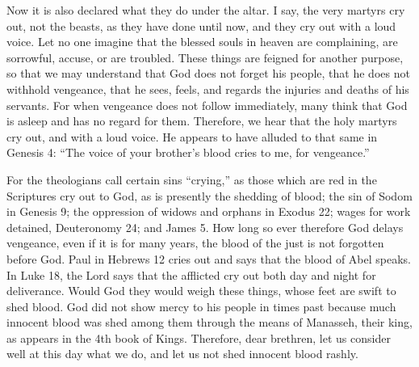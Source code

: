 Now it is also declared what they do under the altar. I say, the very martyrs cry out, not the beasts, as they have done until now, and they cry out with a loud voice. Let no one imagine that the blessed souls in heaven are complaining, are sorrowful, accuse, or are troubled. These things are feigned for another purpose, so that we may understand that God does not forget his people, that he does not withhold vengeance, that he sees, feels, and regards the injuries and deaths of his servants. For when vengeance does not follow immediately, many think that God is asleep and has no regard for them. Therefore, we hear that the holy martyrs cry out, and with a loud voice. He appears to have alluded to that same in Genesis 4: “The voice of your brother’s blood cries to me, for vengeance.”

For the theologians call certain sins “crying,” as those which are red in the Scriptures cry out to God, as is presently the shedding of blood; the sin of Sodom in Genesis 9; the oppression of widows and orphans in Exodus 22; wages for work detained, Deuteronomy 24; and James 5. How long so ever therefore God delays vengeance, even if it is for many years, the blood of the just is not forgotten before God. Paul in Hebrews 12 cries out and says that the blood of Abel speaks. In Luke 18, the Lord says that the afflicted cry out both day and night for deliverance. Would God they would weigh these things, whose feet are swift to shed blood. God did not show mercy to his people in times past because much innocent blood was shed among them through the means of Manasseh, their king, as appears in the 4th book of Kings. Therefore, dear brethren, let us consider well at this day what we do, and let us not shed innocent blood rashly.

